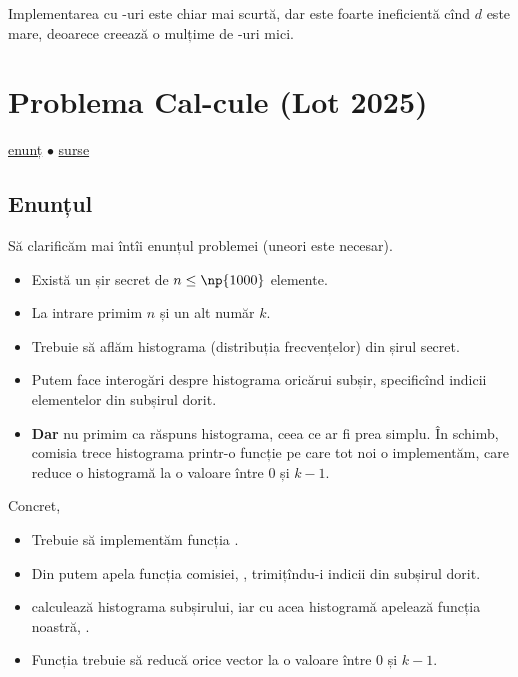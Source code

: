 Implementarea cu -uri este chiar mai scurtă, dar este foarte ineficientă cînd $d$ este mare, deoarece creează o mulțime de -uri mici.


\section{Problema Cal-cule (Lot 2025)}
\label{problem:cal-cule}

\href{https://kilonova.ro/problems/3820}{enunț}
$\bullet$
\hyperref[code:cal-cule]{surse}

\subsection{Enunțul}

Să clarificăm mai întîi enunțul problemei (uneori este necesar).

\begin{itemize}
  \item Există un șir secret de $n \leq \np{1000}$ elemente.

  \item La intrare primim $n$ și un alt număr $k$.

  \item Trebuie să aflăm histograma (distribuția frecvențelor) din șirul secret.

  \item Putem face interogări despre histograma oricărui subșir, specificînd indicii elementelor din subșirul dorit.

  \item \textbf{Dar} nu primim ca răspuns histograma, ceea ce ar fi prea simplu. În schimb, comisia trece histograma printr-o funcție pe care tot noi o implementăm, care reduce o histogramă la o valoare între $0$ și $k-1$.
\end{itemize}

Concret,

\begin{itemize}
  \item Trebuie să implementăm funcția .

  \item Din  putem apela funcția comisiei, , trimițîndu-i indicii din subșirul dorit.

  \item {} calculează histograma subșirului, iar cu acea histogramă apelează funcția noastră, .

  \item Funcția  trebuie să reducă orice vector la o valoare între $0$ și $k-1$.
\end{itemize}

